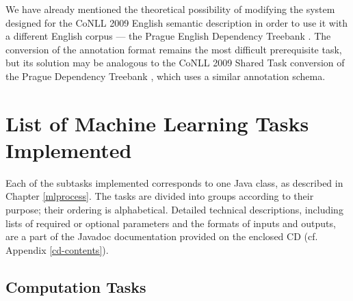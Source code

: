 \documentclass[12pt,notitlepage]{report}
\begin{document}
We have already mentioned the theoretical possibility of modifying the system designed for the CoNLL 2009 English semantic description in order to use it with a different English corpus --- the Prague English Dependency Treebank \citep{cinkova09}. The conversion of the annotation format remains the most difficult prerequisite task, but its solution may be analogous to the CoNLL 2009 Shared Task conversion of the Prague Dependency Treebank \citep{hajic06,hajic09}, which uses a similar annotation schema.

\cleardoublepage
{}
\printnomenclature[2cm]
\cleardoublepage



\appendix

\chapter{List of Machine Learning Tasks Implemented}\label{tasks-list}

Each of the subtasks implemented corresponds to one Java class, as described in Chapter \ref{mlprocess}. The tasks are divided into groups according to their purpose; their ordering is alphabetical. Detailed technical descriptions, including lists of required or optional parameters and the formats of inputs and outputs, are a part of the Javadoc documentation provided on the enclosed CD (cf. Appendix \ref{cd-contents}).

\section*{Computation Tasks}
\end{document}
